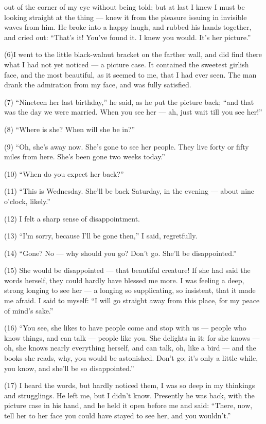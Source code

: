 \documentclass[UTF8,11pt]{ctexart}
\begin{document}
out of the corner of my eye without being told; but at last I knew I must be looking straight at the thing — knew it from the pleasure issuing in invisible waves from him. He broke into a happy laugh, and rubbed his hands together, and cried out: “That’s it! You’ve found it. I knew you would. It’s her picture.”


(6)I went to the little black-walnut bracket on the farther wall, and did find there what I had not yet noticed — a picture case. It contained the sweetest girlish face, and the most beautiful, as it seemed to me, that I had ever seen. The man drank the admiration from my face, and was fully satisfied.


(7) “Nineteen her last birthday,” he said, as he put the picture back; “and that was the day we were married. When you see her — ah, just wait till you see her!”


(8) “Where is she? When will she be in?”


(9) “Oh, she’s away now. She’s gone to see her people. They live forty or fifty miles from here. She’s been gone two weeks today.”


(10) “When do you expect her back?”


(11) “This is Wednesday. She’ll be back Saturday, in the evening — about nine o’clock, likely.”


(12) I felt a sharp sense of disappointment.


(13) “I’m sorry, because I’ll be gone then,” I said, regretfully.


(14) “Gone? No — why should you go? Don’t go. She’ll be disappointed.”


(15) She would be disappointed — that beautiful creature! If she had said the words herself, they could hardly have blessed me more. I was feeling a deep, strong longing to see her — a longing so supplicating, so insistent, that it made me afraid. I said to myself: “I will go straight away from this place, for my peace of mind’s sake.”


(16) “You see, she likes to have people come and stop with us — people who know things, and can talk — people like you. She delights in it; for she knows — oh, she knows nearly everything herself, and can talk, oh, like a bird — and the books she reads, why, you would be astonished. Don’t go; it’s only a little while, you know, and she’ll be so disappointed.”


(17) I heard the words, but hardly noticed them, I was so deep in my thinkings and strugglings. He left me, but I didn’t know. Presently he was back, with the picture case in his hand, and he held it open before me and said: “There, now, tell her to her face you could have stayed to see her, and you wouldn’t.”
\end{document}
